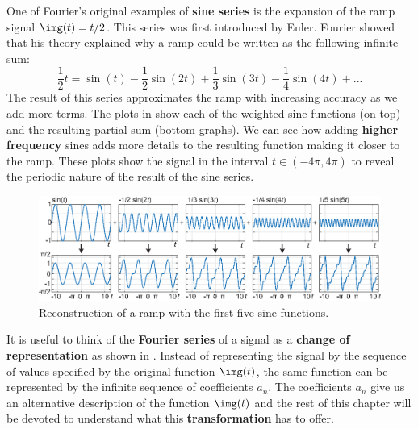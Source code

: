 One of Fourier's original examples of {\bf sine series} 
is the expansion of the ramp signal $\img (t)=t/2$. This series was first introduced by Euler. Fourier showed that his theory explained why a ramp could be written as the following infinite sum:
\begin{equation}
\frac{1}{2} t =  \sin (t) - \frac{1}{2}  \sin (2t) + \frac{1}{3} \sin (3t) - \frac{1}{4}  \sin (4t) + ...
\end{equation}
The result of this series approximates the ramp with increasing accuracy as we add more terms. The plots in \fig{\ref{fig:FourierSeries6}} show each of the weighted sine functions (on top) and the resulting partial sum (bottom graphs). We can see how adding {\bf higher frequency} sines adds more details to the resulting function making it closer to the ramp. These plots show the signal in the interval $t \in (-4 \pi, 4 \pi)$ to reveal the periodic nature of the result of the sine series. 

\begin{figure}[t]
\centerline{
\includegraphics[width=1\linewidth]{figures/Image_processing_fourier/FourierSeries6.eps}
}
\caption{Reconstruction of a ramp with the first five sine functions.}
\label{fig:FourierSeries6}
\end{figure}


It is useful to think of the {\bf Fourier series} of a signal as a {\bf change of representation} as shown in \fig{\ref{fig:FourierSeries5_representation}}. Instead of representing the signal by the sequence of values specified by the original function $\img (t)$, the same function can be represented by the infinite sequence of coefficients $a_n$. The coefficients $a_n$ give us an alternative description of the function $\img(t)$ and the rest of this chapter will be devoted to understand what this {\bf transformation} has to offer.  

